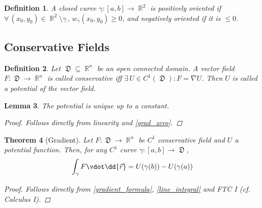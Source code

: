 \documentclass[12pt]{article}
\renewcommand{\grad}{\nabla}
\newcommand{\Forall}[1]{\forall\,{#1}\,,\,}
\newcommand{\Exist}[1]{\exists\,{#1}:}
\DeclareMathOperator{\R}{\mathbb{R}}
\DeclareMathOperator{\D}{\mathfrak{D}}
\newtheorem{theorem}{Theorem}[subsection]
\newtheorem{definition}[theorem]{Definition}
\newtheorem{lemma}[theorem]{Lemma}
\begin{document}
\begin{definition}
  A closed curve $\gamma:[a,b]\to\R^2$ is positively oriented if $\Forall{(x_0,y_0)\in\R^2\setminus\gamma}w_\gamma(x_0,y_0)\geq 0$, and negatively oriented if it is $\leq 0$.
\end{definition}

\pagebreak

\subsection{Conservative Fields}

\begin{definition}
  Let $\D\subseteq\R^n$ be an open connected domain. A vector field $F:\D\to\R^n$ is called conservative iff $\Exist{U\in C^1(\D)}F=\grad U$. Then $U$ is called a potential of the vector field.
\end{definition}

\begin{lemma}
  The potential is unique up to a constant.
  \begin{proof}
    Follows directly from linearity and \ref{grad_zero}.
  \end{proof}
\end{lemma}

\begin{theorem}[Gradient]
  Let $F:\D\to\R^n$ be $C^1$ conservative field and $U$ a potential function. Then, for any $C^1$ curve $\gamma:[a,b]\to\D$, $$\int_{\gamma} F\vdot\dd{\vec{r}}=U(\gamma(b))-U(\gamma(a))$$
  \begin{proof}
    Follows directly from \ref{gradient_formula}, \ref{line_integral} and FTC I (cf. Calculus I).
  \end{proof}
\end{theorem}
\end{document}
